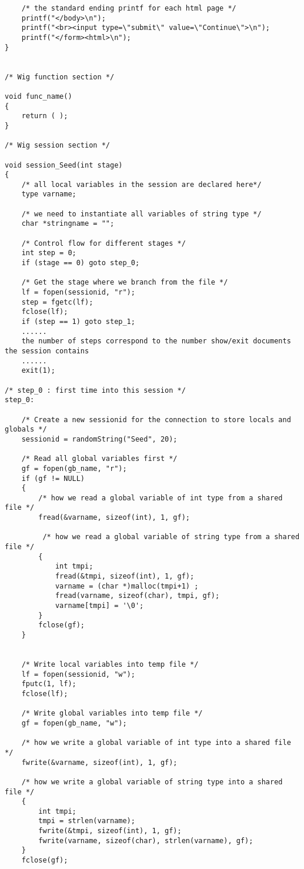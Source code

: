\documentclass{WigReport}
\begin{document}
\begin{verbatim}
    /* the standard ending printf for each html page */
    printf("</body>\n");
    printf("<br><input type=\"submit\" value=\"Continue\">\n");
    printf("</form><html>\n");
}


/* Wig function section */

void func_name()
{
    return ( );
}

/* Wig session section */

void session_Seed(int stage)
{
    /* all local variables in the session are declared here*/    
    type varname;
    
    /* we need to instantiate all variables of string type */
    char *stringname = "";

    /* Control flow for different stages */
    int step = 0;
    if (stage == 0) goto step_0;

    /* Get the stage where we branch from the file */
    lf = fopen(sessionid, "r");
    step = fgetc(lf);
    fclose(lf);
    if (step == 1) goto step_1;
    ......
	the number of steps correspond to the number show/exit documents the session contains
    ......
    exit(1);

/* step_0 : first time into this session */
step_0:

    /* Create a new sessionid for the connection to store locals and globals */
    sessionid = randomString("Seed", 20);

    /* Read all global variables first */
    gf = fopen(gb_name, "r");
    if (gf != NULL)
    {
	    /* how we read a global variable of int type from a shared file */
		fread(&varname, sizeof(int), 1, gf);
		
		 /* how we read a global variable of string type from a shared file */
        {
            int tmpi;
            fread(&tmpi, sizeof(int), 1, gf);
            varname = (char *)malloc(tmpi+1) ;
            fread(varname, sizeof(char), tmpi, gf);
            varname[tmpi] = '\0';
        }
        fclose(gf);
    }

	
	/* Write local variables into temp file */
    lf = fopen(sessionid, "w");
    fputc(1, lf);
    fclose(lf);

	/* Write global variables into temp file */
	gf = fopen(gb_name, "w");
	
	/* how we write a global variable of int type into a shared file */
    fwrite(&varname, sizeof(int), 1, gf);
	
    /* how we write a global variable of string type into a shared file */
    {
        int tmpi;
        tmpi = strlen(varname);
        fwrite(&tmpi, sizeof(int), 1, gf);
        fwrite(varname, sizeof(char), strlen(varname), gf);
    }
    fclose(gf);


\end{verbatim}
\end{document}
